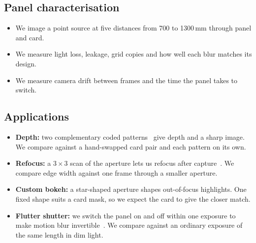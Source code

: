 \subsection{Panel characterisation}\label{sec:panel}

\begin{itemize}
\item We image a point source at five distances from 700 to 1300\,mm through panel and card.
\item We measure light loss, leakage, grid copies and how well each blur matches its design.
\item We measure camera drift between frames and the time the panel takes to switch.
\end{itemize}

\subsection{Applications}\label{sec:apps}

\begin{itemize}
\item \textbf{Depth:} two complementary coded patterns~\cite{zhou2009pairs} give depth and a sharp image. We compare against a hand-swapped card pair and each pattern on its own.
\item \textbf{Refocus:} a $3 \times 3$ scan of the aperture lets us refocus after capture~\cite{ng2005lightfield}. We compare edge width against one frame through a smaller aperture.
\item \textbf{Custom bokeh:} a star-shaped aperture shapes out-of-focus highlights. One fixed shape suits a card mask, so we expect the card to give the closer match.
\item \textbf{Flutter shutter:} we switch the panel on and off within one exposure to make motion blur invertible~\cite{raskar2006coded}. We compare against an ordinary exposure of the same length in dim light.
\end{itemize}
